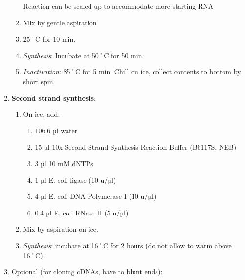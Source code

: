 \documentclass[
  letterpaper,
  DIV=11,
  numbers=noendperiod]{scrreprt}
\providecommand{\tightlist}{%
  \setlength{\itemsep}{0pt}\setlength{\parskip}{0pt}}\usepackage{longtable,booktabs,array}
\begin{document}
\begin{enumerate}
\begin{enumerate}
    \begin{tcolorbox}[enhanced jigsaw, rightrule=.15mm, title=\textcolor{quarto-callout-important-color}{\faExclamation}\hspace{0.5em}{NOTE}, titlerule=0mm, opacitybacktitle=0.6, toprule=.15mm, bottomrule=.15mm, opacityback=0, left=2mm, colframe=quarto-callout-important-color-frame, breakable, coltitle=black, colback=white, colbacktitle=quarto-callout-important-color!10!white, bottomtitle=1mm, leftrule=.75mm, toptitle=1mm, arc=.35mm]

    Reaction can be scaled up to accommodate more starting RNA

    \end{tcolorbox}
  \item
    Mix by gentle aspiration
  \item
    25˚C for 10 min.
  \item
    \emph{Synthesis}: Incubate at 50˚C for 50 min.
  \item
    \emph{Inactivation}: 85˚C for 5 min. Chill on ice, collect contents
    to bottom by short spin.
  \end{enumerate}
\item
  \textbf{Second strand synthesis}:

  \begin{enumerate}
  \def\labelenumii{\arabic{enumii}.}
  \item
    On ice, add:

    \begin{enumerate}
    \def\labelenumiii{\arabic{enumiii}.}
    \tightlist
    \item
      106.6 µl water
    \item
      15 µl 10x Second-Strand Synthesis Reaction Buffer (B6117S, NEB)
    \item
      3 µl 10 mM dNTPs
    \item
      1 µl E. coli ligase (10 u/µl)
    \item
      4 µl E. coli DNA Polymerase I (10 u/µl)
    \item
      0.4 µl E. coli RNase H (5 u/µl)
    \end{enumerate}
  \item
    Mix by aspiration on ice.
  \item
    \emph{Synthesis}: incubate at 16˚C for 2 hours (do not allow to warm
    above 16˚C).
  \end{enumerate}
\item
  Optional (for cloning cDNAs, have to blunt ends):


\end{enumerate}
\end{document}
